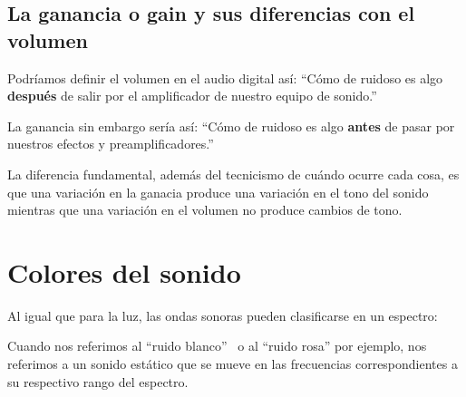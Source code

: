\subsection{La ganancia o gain y sus diferencias con el volumen}\label{sec:Gain}

Podríamos definir el volumen en el audio digital así: ``Cómo de ruidoso es algo \textbf{después} de salir por el amplificador de nuestro equipo de sonido.'' 

La ganancia sin embargo sería así: ``Cómo de ruidoso es algo \textbf{antes} de pasar por nuestros efectos y preamplificadores.''

La diferencia fundamental, además del tecnicismo de cuándo ocurre cada cosa, es que una variación en la ganacia produce una variación en el tono del sonido mientras que una variación en el volumen no produce cambios de tono.

\section{Colores del sonido}

Al igual que para la luz, las ondas sonoras pueden clasificarse en un espectro:


Cuando nos referimos al ``ruido blanco'' \ o al ``ruido rosa'' por ejemplo, nos referimos a un sonido estático que se mueve en las frecuencias correspondientes a su respectivo rango del espectro.
